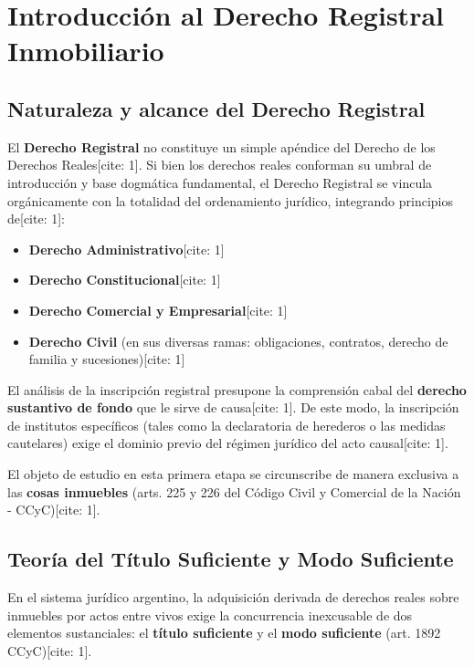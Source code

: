 \documentclass[12pt,oneside]{book}
\begin{document}
\chapter{Introducción al Derecho Registral Inmobiliario}

\section{Naturaleza y alcance del Derecho Registral}

El \textbf{Derecho Registral} no constituye un simple apéndice del Derecho de los Derechos Reales[cite: 1]. Si bien los derechos reales conforman su umbral de introducción y base dogmática fundamental, el Derecho Registral se vincula orgánicamente con la totalidad del ordenamiento jurídico, integrando principios de[cite: 1]:

\begin{itemize}
    \item \textbf{Derecho Administrativo}[cite: 1]
    \item \textbf{Derecho Constitucional}[cite: 1]
    \item \textbf{Derecho Comercial y Empresarial}[cite: 1]
    \item \textbf{Derecho Civil} (en sus diversas ramas: obligaciones, contratos, derecho de familia y sucesiones)[cite: 1]
\end{itemize}

El análisis de la inscripción registral presupone la comprensión cabal del \textbf{derecho sustantivo de fondo} que le sirve de causa[cite: 1]. De este modo, la inscripción de institutos específicos (tales como la declaratoria de herederos o las medidas cautelares) exige el dominio previo del régimen jurídico del acto causal[cite: 1].

El objeto de estudio en esta primera etapa se circunscribe de manera exclusiva a las \textbf{cosas inmuebles} (arts. 225 y 226 del Código Civil y Comercial de la Nación - CCyC)[cite: 1].

\section{Teoría del Título Suficiente y Modo Suficiente}

En el sistema jurídico argentino, la adquisición derivada de derechos reales sobre inmuebles por actos entre vivos exige la concurrencia inexcusable de dos elementos sustanciales: el \textbf{título suficiente} y el \textbf{modo suficiente} (art. 1892 CCyC)[cite: 1].
\end{document}
